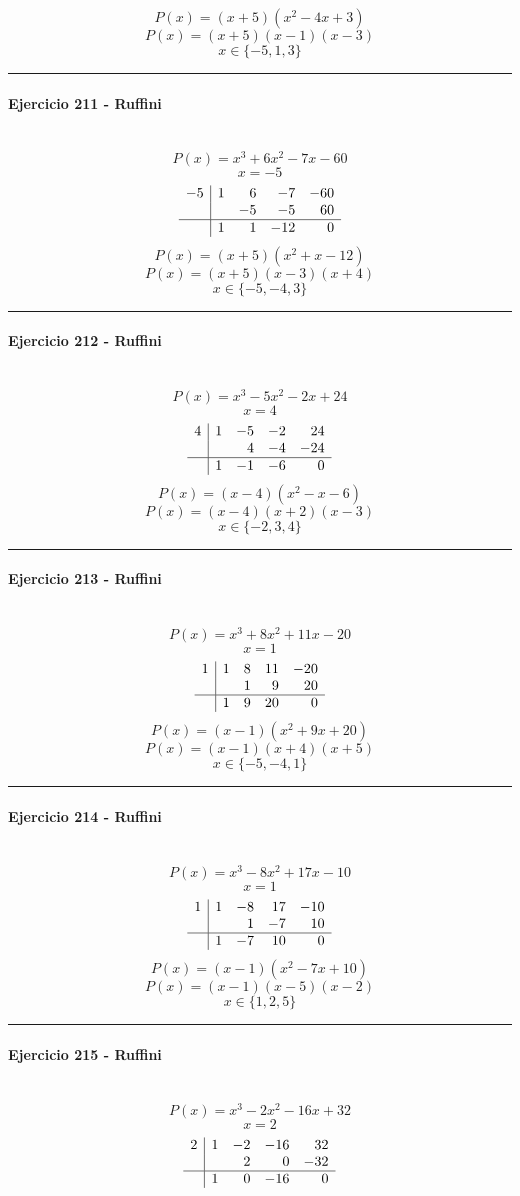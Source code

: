 \documentclass[10pt,a4paper]{article}
\newcommand{\res}[1]{\paragraph{#1}\mbox{}\\[-1.2em]}
\begin{document}
\[ P(x)=(x+5)(x^{2} - 4 x + 3) \]
\[ P(x)=(x+5)(x-1)(x-3) \]
\[ \boxed{x\in\{-5,1,3\}} \]
\vspace{1mm}\hrule\vspace{2mm}
\res{Ejercicio 211 - Ruffini}
\[ P(x)=x^{3} + 6 x^{2} - 7 x - 60 \]
\[ x=-5 \]
\[\begin{array}{r|rrrr}-5 & 1 & 6 & -7 & -60\\  &  & -5 & -5 & 60\\\hline  & 1 & 1 & -12 & 0\end{array}\]
\[ P(x)=(x+5)(x^{2} + x - 12) \]
\[ P(x)=(x+5)(x-3)(x+4) \]
\[ \boxed{x\in\{-5,-4,3\}} \]
\vspace{1mm}\hrule\vspace{2mm}
\res{Ejercicio 212 - Ruffini}
\[ P(x)=x^{3} - 5 x^{2} - 2 x + 24 \]
\[ x=4 \]
\[\begin{array}{r|rrrr}4 & 1 & -5 & -2 & 24\\  &  & 4 & -4 & -24\\\hline  & 1 & -1 & -6 & 0\end{array}\]
\[ P(x)=(x-4)(x^{2} - x - 6) \]
\[ P(x)=(x-4)(x+2)(x-3) \]
\[ \boxed{x\in\{-2,3,4\}} \]
\vspace{1mm}\hrule\vspace{2mm}
\res{Ejercicio 213 - Ruffini}
\[ P(x)=x^{3} + 8 x^{2} + 11 x - 20 \]
\[ x=1 \]
\[\begin{array}{r|rrrr}1 & 1 & 8 & 11 & -20\\  &  & 1 & 9 & 20\\\hline  & 1 & 9 & 20 & 0\end{array}\]
\[ P(x)=(x-1)(x^{2} + 9 x + 20) \]
\[ P(x)=(x-1)(x+4)(x+5) \]
\[ \boxed{x\in\{-5,-4,1\}} \]
\vspace{1mm}\hrule\vspace{2mm}
\res{Ejercicio 214 - Ruffini}
\[ P(x)=x^{3} - 8 x^{2} + 17 x - 10 \]
\[ x=1 \]
\[\begin{array}{r|rrrr}1 & 1 & -8 & 17 & -10\\  &  & 1 & -7 & 10\\\hline  & 1 & -7 & 10 & 0\end{array}\]
\[ P(x)=(x-1)(x^{2} - 7 x + 10) \]
\[ P(x)=(x-1)(x-5)(x-2) \]
\[ \boxed{x\in\{1,2,5\}} \]
\vspace{1mm}\hrule\vspace{2mm}
\res{Ejercicio 215 - Ruffini}
\[ P(x)=x^{3} - 2 x^{2} - 16 x + 32 \]
\[ x=2 \]
\[\begin{array}{r|rrrr}2 & 1 & -2 & -16 & 32\\  &  & 2 & 0 & -32\\\hline  & 1 & 0 & -16 & 0\end{array}\]
\end{document}
